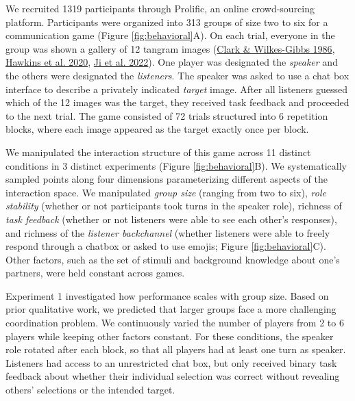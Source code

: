 \documentclass[
  english,
  a4paper,
]{article}
\begin{document}
We recruited 1319 participants through Prolific, an online crowd-sourcing platform.
Participants were organized into 313 groups of size two to six for a communication game (Figure \ref{fig:behavioral}A).
On each trial, everyone in the group was shown a gallery of 12 tangram images (\protect\hyperlink{ref-clark1986}{Clark \& Wilkes-Gibbs 1986}, \protect\hyperlink{ref-hawkins2020}{Hawkins et al. 2020}, \protect\hyperlink{ref-ji2022abstract}{Ji et al. 2022}).
One player was designated the \emph{speaker} and the others were designated the \emph{listeners}.
The speaker was asked to use a chat box interface to describe a privately indicated \emph{target} image.
After all listeners guessed which of the 12 images was the target, they received task feedback and proceeded to the next trial.
The game consisted of 72 trials structured into 6 repetition blocks, where each image appeared as the target exactly once per block.

We manipulated the interaction structure of this game across 11 distinct conditions in 3 distinct experiments (Figure \ref{fig:behavioral}B).
We systematically sampled points along four dimensions parameterizing different aspects of the interaction space.
We manipulated \emph{group size} (ranging from two to six), \emph{role stability} (whether or not participants took turns in the speaker role), richness of \emph{task feedback} (whether or not listeners were able to see each other's responses), and richness of the \emph{listener backchannel} (whether listeners were able to freely respond through a chatbox or asked to use emojis; Figure \ref{fig:behavioral}C).
Other factors, such as the set of stimuli and background knowledge about one's partners, were held constant across games.

Experiment 1 investigated how performance scales with group size.
Based on prior qualitative work, we predicted that larger groups face a more challenging coordination problem.
We continuously varied the number of players from 2 to 6 players while keeping other factors constant.
For these conditions, the speaker role rotated after each block, so that all players had at least one turn as speaker.
Listeners had access to an unrestricted chat box, but only received binary task feedback about whether their individual selection was correct without revealing others' selections or the intended target.
\end{document}
